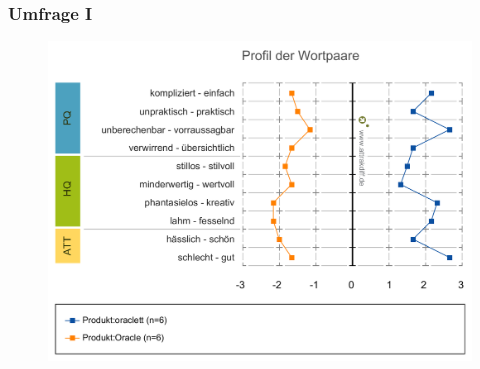 \documentclass{beamer}
\begin{document}
\begin{frame}
  \frametitle{Umfrage I}

  \begin{figure}
    \centering
    \includegraphics[scale=0.3]{attrak-wortpaare.png}
  \end{figure}
\end{frame}
\end{document}
